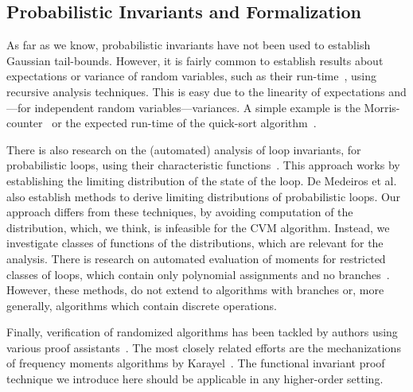 \subsection{Probabilistic Invariants and Formalization}
As far as we know, probabilistic invariants have not been used to establish Gaussian tail-bounds.
However, it is fairly common to establish results about expectations or variance of random variables, such as their run-time~\cite[Section 1.4]{motwani1995}, using recursive analysis techniques.
This is easy due to the linearity of expectations and---for independent random variables---variances.
A simple example is the Morris-counter~\cite{morris1978} or the expected run-time of the quick-sort algorithm~\cite[Section 2.5]{mitzenmacher2005}.

There is also research on the (automated) analysis of loop invariants, for probabilistic loops, using their characteristic functions~\cite{batz2023, mciver2005}.
This approach works by establishing the limiting distribution of the state of the loop.
De Medeiros et al.~\cite[Section 3.2]{demedeiros2024} also establish methods to derive limiting distributions of probabilistic loops.
Our approach differs from these techniques, by avoiding computation of the distribution, which, we think, is infeasible for the CVM algorithm.
Instead, we investigate classes of functions of the distributions, which are relevant for the analysis.
There is research on automated evaluation of moments for restricted classes of loops, which contain only polynomial assignments and no branches~\cite{bartocci2019,kofnov2022}.
However, these methods, do not extend to algorithms with branches or, more generally, algorithms which contain discrete operations.

Finally, verification of randomized algorithms has been tackled by authors using various proof assistants~\cite{bosshard2024,demedeiros2024, eberl2020,gopinathan20,hurd03, Probabilistic_Prime_Tests-AFP, tan2024}.
The most closely related efforts are the mechanizations of frequency moments algorithms by Karayel~\cite{karayel2022, karayel2023}.
The functional invariant proof technique we introduce here should be applicable in any higher-order setting.
